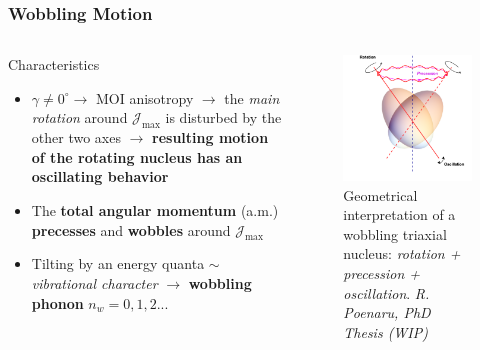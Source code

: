 \documentclass{beamer}
\begin{document}
\begin{frame}
	\frametitle{Wobbling Motion}
		\begin{columns}
			\begin{column}{0.6\textwidth}
				\begin{block}{Characteristics}
					\begin{itemize}
						\item $\gamma\neq0^\circ\rightarrow$ MOI anisotropy $\rightarrow$ the \emph{main rotation} around $\mathcal{J}_\text{max}$ is disturbed by the other two axes  $\rightarrow$ \textbf{resulting motion of the rotating nucleus has an oscillating behavior}
						\item The \textbf{total angular momentum } (a.m.) \textbf{precesses} and \textbf{wobbles} around $\mathcal{J}_\text{max}$
						\item Tilting by an energy quanta $\sim$ \emph{vibrational character} $\rightarrow$ \textbf{wobbling phonon} $n_w=0,1,2...$
					\end{itemize}
				\end{block}
			\end{column}
			\begin{column}{0.4\textwidth}
				\begin{figure}
					\includegraphics[width=\textwidth]{figures/wobbling-schematic.png}
					\vspace{-0.7cm}
					\caption{Geometrical interpretation of a wobbling triaxial nucleus: \emph{rotation + precession + oscillation}. \emph{R. Poenaru, PhD Thesis (WIP)}}
				\end{figure}
			\end{column}
		\end{columns}
\end{frame}
\end{document}
